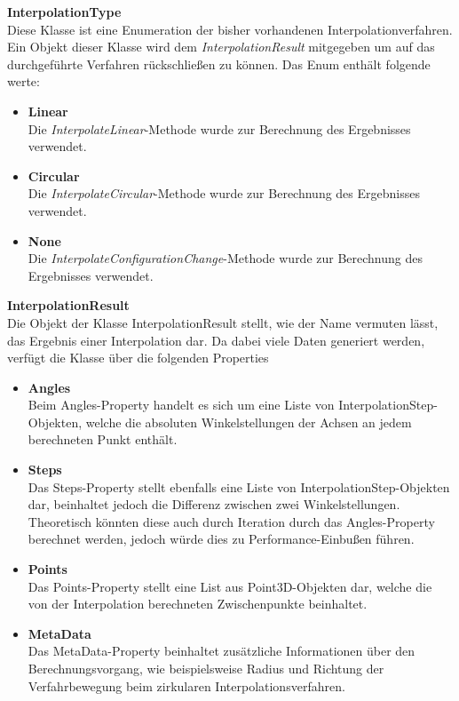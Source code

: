\textbf{InterpolationType}\\
Diese Klasse ist eine Enumeration der bisher vorhandenen Interpolationverfahren. Ein Objekt dieser Klasse wird dem \textit{InterpolationResult} mitgegeben um auf das durchgeführte Verfahren rückschließen zu können. Das Enum enthält folgende werte:
\begin{itemize}
\item \textbf{Linear}\\
Die \textit{InterpolateLinear}-Methode wurde zur Berechnung des Ergebnisses verwendet.
\item \textbf{Circular} \\
Die \textit{InterpolateCircular}-Methode wurde zur Berechnung des Ergebnisses verwendet.
\item \textbf{None}\\
Die \textit{InterpolateConfigurationChange}-Methode wurde zur Berechnung des Ergebnisses verwendet.
\end{itemize}
\newpage
\textbf{InterpolationResult}\\
Die Objekt der Klasse InterpolationResult stellt, wie der Name vermuten lässt, das Ergebnis einer Interpolation dar. Da dabei viele Daten generiert werden, verfügt die Klasse über die folgenden Properties
\begin{itemize}
\item \textbf{Angles}\\
Beim Angles-Property handelt es sich um eine Liste von InterpolationStep-Objekten, welche die absoluten Winkelstellungen der Achsen an jedem berechneten Punkt enthält. 
\item \textbf{Steps}\\
Das Steps-Property stellt ebenfalls eine Liste von InterpolationStep-Objekten dar, beinhaltet jedoch die Differenz zwischen zwei Winkelstellungen. Theoretisch könnten diese auch durch Iteration durch das Angles-Property berechnet werden, jedoch würde dies zu Performance-Einbußen führen. 
\item \textbf{Points}\\
Das Points-Property stellt eine List aus Point3D-Objekten dar, welche die von der Interpolation berechneten Zwischenpunkte beinhaltet.
\item \textbf{MetaData}\\
Das MetaData-Property beinhaltet zusätzliche Informationen über den Berechnungsvorgang, wie beispielsweise Radius und Richtung der Verfahrbewegung beim zirkularen Interpolationsverfahren.
\end{itemize}
